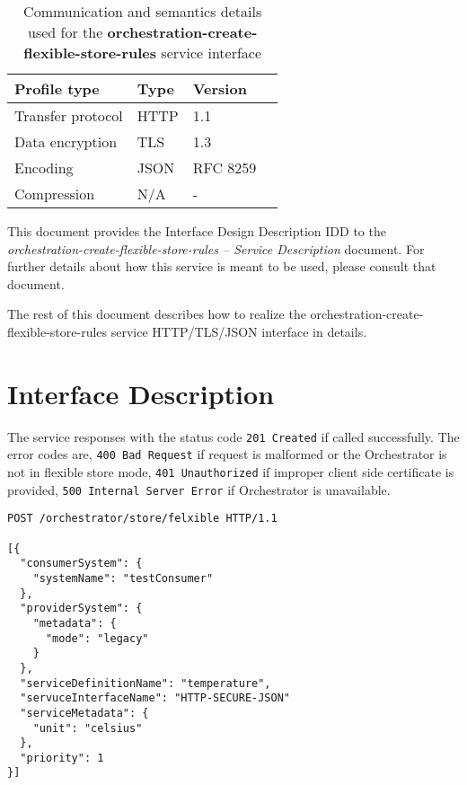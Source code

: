 \documentclass[a4paper]{arrowhead}
\newcommand{\fref}[1]{{\textcolor{ArrowheadBlue}{\hyperref[sec:functions:#1]{#1}}}}
\begin{document}
\begin{table}[ht!]
  \centering
  \begin{tabular}{|l|l|l|l|}
    \rowcolor{gray!33} Profile type & Type & Version \\ \hline
    Transfer protocol & HTTP & 1.1 \\ \hline
    Data encryption & TLS & 1.3 \\ \hline
    Encoding & JSON & RFC 8259 \cite{rfc8259} \\ \hline
    Compression & N/A & - \\ \hline
  \end{tabular}
  \caption{Communication and semantics details used for the \textbf{orchestration-create-flexible-store-rules} service interface}
  \label{tab:comunication_semantics_profile}
\end{table}

This document provides the Interface Design Description IDD to the \textit{orchestration-create-flexible-store-rules -- Service Description} document.
For further details about how this service is meant to be used, please consult that document.

The rest of this document describes how to realize the orchestration-create-flexible-store-rules service HTTP/TLS/JSON interface in details.

\newpage

\section{Interface Description}
\label{sec:functions}

The service responses with the status code \texttt{201 Created} if called successfully. The error codes are, \texttt{400 Bad Request} if request is malformed or the Orchestrator is not in flexible store mode, \texttt{401 Unauthorized} if improper client side certificate is provided, \texttt{500 Internal Server Error} if Orchestrator is unavailable.

\begin{lstlisting}[language=http,label={lst:orchestration-create-flexible-store-rules},caption={An \fref{orchestration-create-flexible-store-rules} invocation.}]
POST /orchestrator/store/felxible HTTP/1.1

[{
  "consumerSystem": {
    "systemName": "testConsumer"
  },
  "providerSystem": {
    "metadata": {
      "mode": "legacy"
    }
  },
  "serviceDefinitionName": "temperature",
  "servuceInterfaceName": "HTTP-SECURE-JSON"
  "serviceMetadata": {
    "unit": "celsius"
  },
  "priority": 1
}]
\end{lstlisting}
\end{document}
